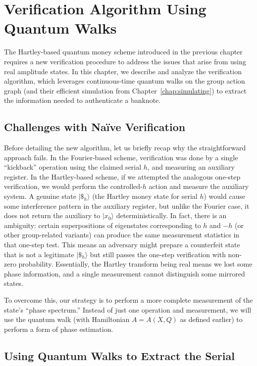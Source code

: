 \documentclass[12pt]{report}
\begin{document}
\chapter{Verification Algorithm Using Quantum Walks}\label{chap:verification}

The Hartley-based quantum money scheme introduced in the previous chapter requires a new verification procedure to address the issues that arise from using real amplitude states. In this chapter, we describe and analyze the verification algorithm, which leverages continuous-time quantum walks on the group action graph (and their efficient simulation from Chapter~\ref{chap:simulating}) to extract the information needed to authenticate a banknote.

    \section{Challenges with Naïve Verification}
    Before detailing the new algorithm, let us briefly recap why the straightforward approach fails. In the Fourier-based scheme, verification was done by a single “kickback” operation using the claimed serial $h$, and measuring an auxiliary register. In the Hartley-based scheme, if we attempted the analogous one-step verification, we would perform the controlled-$h$ action and measure the auxiliary system. A genuine state $|\$_h\rangle$ (the Hartley money state for serial $h$) would cause some interference pattern in the auxiliary register, but unlike the Fourier case, it does not return the auxiliary to $|x_0\rangle$ deterministically. In fact, there is an ambiguity: certain superpositions of eigenstates corresponding to $h$ and $-h$ (or other group-related variants) can produce the same measurement statistics in that one-step test. This means an adversary might prepare a counterfeit state that is not a legitimate $|\$_h\rangle$ but still passes the one-step verification with non-zero probability. Essentially, the Hartley transform being real means we lost some phase information, and a single measurement cannot distinguish some mirrored states.

    To overcome this, our strategy is to perform a more complete measurement of the state’s “phase spectrum.” Instead of just one operation and measurement, we will use the quantum walk (with Hamiltonian $A = A(X,Q)$ as defined earlier) to perform a form of phase estimation.

    \section{Using Quantum Walks to Extract the Serial}
    
\end{document}
